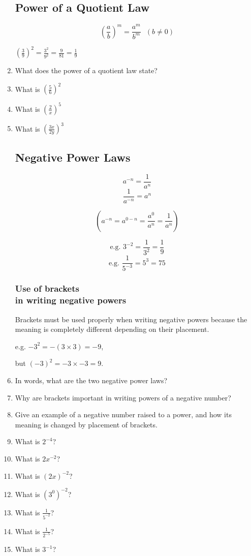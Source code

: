 \documentclass{article}
\begin{document}
\begin{enumerate}
\subsection*{Power of a Quotient Law}
\begin{Large}
$$\left(\frac{a}{b}\right)^m=\frac{a^m}{b^m} \ \ \ (b\neq0)$$
\end{Large}
\begin{center}
\begin{large}
$\left(\frac{3}{9}\right)^2=\frac{3^2}{9^2}=\frac{9}{81}=\frac{1}{9}$
\end{large}
\end{center}

\item What does the power of a quotient law state?
\item What is $(\frac{5}{6})^2$
\item What is $(\frac{2}{x})^5$
\item What is $(\frac{3x}{2y})^3$

\subsection*{Negative Power Laws}

\begin{Large}
$$a^{-n}=\frac{1}{a^n}$$
$$\frac{1}{a^{-n}}=a^n$$
\end{Large}
$$(a^{-n}=a^{0-n}=\frac{a^0}{a^n}=\frac{1}{a^n})$$
\begin{large}
$$\text{e.g. }3^{-2}=\frac{1}{3^2}=\frac{1}{9}$$
$$\text{e.g. }\frac{1}{5^{-3}}=5^3=75$$
\end{large}

\subsubsection*
{Use of brackets\\ in writing negative powers}
Brackets must be used properly when writing negative powers because the meaning is completely different depending on their placement.

e.g. $-3^2 = -(3 \times 3)=-9$,

but $(-3)^2 = -3 \times -3 = 9.$

\vspace{16pt}
\item In words, what are the two negative power laws?
\item Why are brackets important in writing powers of a negative number?
\item Give an example of a negative number raised to a power, and how its meaning is changed by placement of brackets.
\item What is $2^{-4}$?
\item What is $2x^{-2}$?
\item What is $(2x)^{-2}$?
\item What is $(3^0)^{-2}$?
\item What is $\frac{1}{5^{-2}}$?
\item What is $\frac{1}{2^{-5}}$?
\item What is $3^{-1}$?


\end{enumerate}
\end{document}

